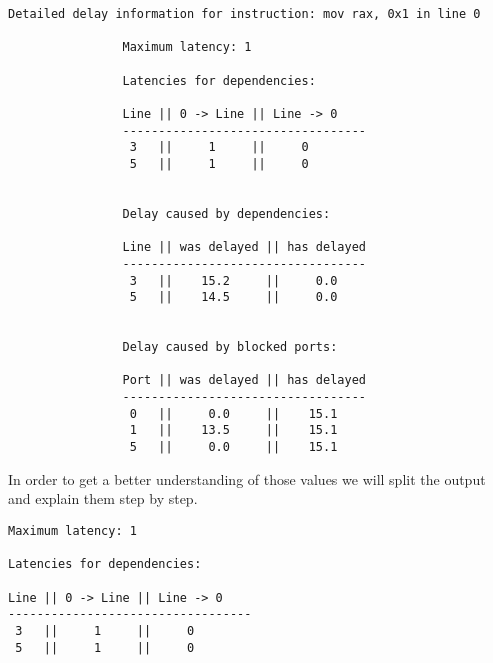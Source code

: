 \documentclass[a4paper,12pt,titlepage, twoside]{report}
\begin{document}
\begin{mdframed}[backgroundcolor=light-gray, roundcorner=10pt,leftmargin=1, rightmargin=1, innerleftmargin=15, innertopmargin=15,innerbottommargin=15, outerlinewidth=1, linecolor=light-gray]
\begin{center}
\begin{BVerbatim}[fontsize=\scriptsize]
Detailed delay information for instruction: mov rax, 0x1 in line 0

                Maximum latency: 1
                
                Latencies for dependencies:
                
                Line || 0 -> Line || Line -> 0
                ----------------------------------
                 3   ||     1     ||     0
                 5   ||     1     ||     0
                
                
                Delay caused by dependencies:
                
                Line || was delayed || has delayed
                ----------------------------------
                 3   ||    15.2     ||     0.0
                 5   ||    14.5     ||     0.0
                
                
                Delay caused by blocked ports:
                
                Port || was delayed || has delayed
                ----------------------------------
                 0   ||     0.0     ||    15.1
                 1   ||    13.5     ||    15.1
                 5   ||     0.0     ||    15.1
\end{BVerbatim}
\end{center}
\end{mdframed}

In order to get a better understanding of those values we will split the output and explain them step by step.

\begin{mdframed}[backgroundcolor=light-gray, roundcorner=10pt,leftmargin=1, rightmargin=1, innerleftmargin=15, innertopmargin=15,innerbottommargin=15, outerlinewidth=1, linecolor=light-gray]
\begin{center}
\begin{BVerbatim}[fontsize=\scriptsize]
Maximum latency: 1

Latencies for dependencies:

Line || 0 -> Line || Line -> 0
----------------------------------
 3   ||     1     ||     0
 5   ||     1     ||     0
\end{BVerbatim}
\end{center}
\end{mdframed}
\end{document}
